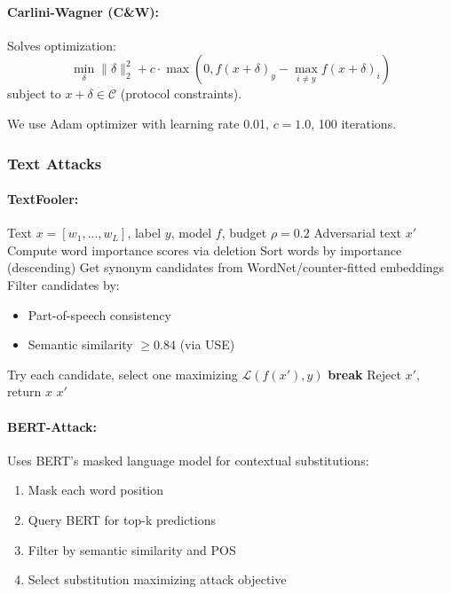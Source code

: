 \documentclass[12pt,a4paper]{article}
\theoremstyle{definition}
\begin{document}
\paragraph{Carlini-Wagner (C\&W):}
Solves optimization:
\begin{equation}
\min_\delta \|\delta\|_2^2 + c \cdot \max(0, f(x+\delta)_y - \max_{i \neq y} f(x+\delta)_i)
\end{equation}
subject to $x + \delta \in \mathcal{C}$ (protocol constraints).

We use Adam optimizer with learning rate 0.01, $c=1.0$, 100 iterations.

\subsubsection{Text Attacks}

\paragraph{TextFooler:}
\begin{algorithm}[H]
\caption{TextFooler Attack}
\begin{algorithmic}[1]
\Require Text $x = [w_1, ..., w_L]$, label $y$, model $f$, budget $\rho=0.2$
\Ensure Adversarial text $x'$
\State Compute word importance scores via deletion
\State Sort words by importance (descending)
  \State Get synonym candidates from WordNet/counter-fitted embeddings
  \State Filter candidates by:
  \begin{itemize}
    \item Part-of-speech consistency
    \item Semantic similarity $\geq 0.84$ (via USE)
  \end{itemize}
  \State Try each candidate, select one maximizing $\mathcal{L}(f(x'), y)$
    \State \textbf{break}
  \EndIf
\EndFor
{}
  \State Reject $x'$, return $x$
\EndIf
\State \Return $x'$
\end{algorithmic}
\end{algorithm}

\paragraph{BERT-Attack:}
Uses BERT's masked language model for contextual substitutions:
\begin{enumerate}
\item Mask each word position
\item Query BERT for top-k predictions
\item Filter by semantic similarity and POS
\item Select substitution maximizing attack objective
\end{enumerate}
\end{document}
